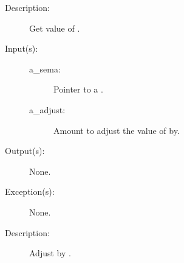 \begin{description}
\begin{description}
	\item[Description: ]
		Get value of .
	\end{description}
\label{sema_adjust}
\item[{\cfunc[void]{sema\_adjust}{cw\_sema\_t *a\_sema}}: ]
	\begin{description}\item[]
	\item[Input(s): ]
		\begin{description}\item[]
		\item[a\_sema: ]
			Pointer to a .
		\item[a\_adjust: ]
			Amount to adjust the value of  by.
		\end{description}
	\item[Output(s): ] None.
	\item[Exception(s): ] None.
	\item[Description: ]
		Adjust  by .
	\end{description}
\end{description}
